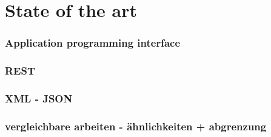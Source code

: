 \part{State of the art}
\label{part:stateoftheart}

\section{Application programming interface}

\section{REST}

\section{XML - JSON}

\section{vergleichbare arbeiten - ähnlichkeiten + abgrenzung}